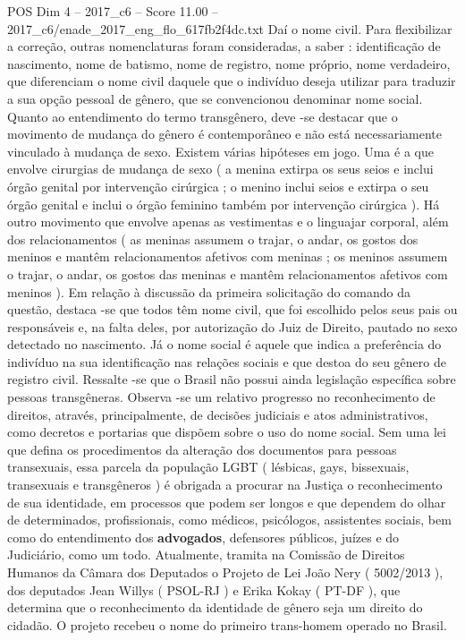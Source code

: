 \begin{textsample}{POS Dim 4 – 2017\_c6 – Score 11.00 – 2017\_c6/enade\_2017\_eng\_flo\_617fb2f4dc.txt}
Daí o nome civil.
Para flexibilizar a correção, outras nomenclaturas foram consideradas, a saber : identificação de nascimento, nome de batismo, nome de registro, nome próprio, nome verdadeiro, que diferenciam o nome civil daquele que o indivíduo deseja utilizar para traduzir a sua opção pessoal de gênero, que se convencionou denominar nome social.
Quanto ao entendimento do termo transgênero, deve -se destacar que o movimento de mudança do gênero é contemporâneo e não está necessariamente vinculado à mudança de sexo.
Existem várias hipóteses em jogo.
Uma é a que envolve cirurgias de mudança de sexo ( a menina extirpa os seus seios e inclui órgão genital por intervenção cirúrgica ; o menino inclui seios e extirpa o seu órgão genital e inclui o órgão feminino também por intervenção cirúrgica ).
Há outro movimento que envolve apenas as vestimentas e o linguajar corporal, além dos relacionamentos ( as meninas assumem o trajar, o andar, os gostos dos meninos e mantêm relacionamentos afetivos com meninas ; os meninos assumem o trajar, o andar, os gostos das meninas e mantêm relacionamentos afetivos com meninos ).
Em relação à discussão da primeira solicitação do comando da questão, destaca -se que todos têm nome civil, que foi escolhido pelos seus pais ou responsáveis e, na falta deles, por autorização do Juiz de Direito, pautado no sexo detectado no nascimento.
Já o nome social é aquele que indica a preferência do indivíduo na sua identificação nas relações sociais e que destoa do seu gênero de registro civil.
Ressalte -se que o Brasil não possui ainda legislação específica sobre pessoas transgêneras.
Observa -se um relativo progresso no reconhecimento de direitos, através, principalmente, de decisões judiciais e atos administrativos, como decretos e portarias que dispõem sobre o uso do nome social.
Sem uma lei que defina os procedimentos da alteração dos documentos para pessoas transexuais, essa parcela da população LGBT ( lésbicas, gays, bissexuais, transexuais e transgêneros ) é obrigada a procurar na Justiça o reconhecimento de sua identidade, em processos que podem ser longos e que dependem do olhar de determinados, profissionais, como médicos, psicólogos, assistentes sociais, bem como do entendimento dos \textbf{advogados}, defensores públicos, juízes e do Judiciário, como um todo.
Atualmente, tramita na Comissão de Direitos Humanos da Câmara dos Deputados o Projeto de Lei João Nery ( 5002/2013 ), dos deputados Jean Willys ( PSOL-RJ ) e Erika Kokay ( PT-DF ), que determina que o reconhecimento da identidade de gênero seja um direito do cidadão.
O projeto recebeu o nome do primeiro trans-homem operado no Brasil.

\end{textsample}
